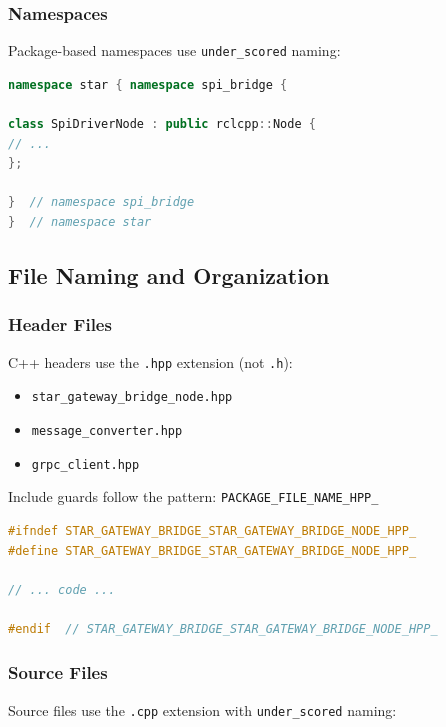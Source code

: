 \subsubsection{Namespaces}

Package-based namespaces use \texttt{under\_scored} naming:

\begin{lstlisting}[language=C++, caption={Namespace examples},
label={lst:namespace}]
namespace star { namespace spi_bridge {

class SpiDriverNode : public rclcpp::Node {
// ...
};

}  // namespace spi_bridge
}  // namespace star
\end{lstlisting}

\subsection{File Naming and Organization}

\subsubsection{Header Files}

C++ headers use the \texttt{.hpp} extension (not \texttt{.h}):

\begin{itemize}
\item \texttt{star\_gateway\_bridge\_node.hpp}
\item \texttt{message\_converter.hpp}
\item \texttt{grpc\_client.hpp}
\end{itemize}

Include guards follow the pattern: \texttt{PACKAGE\_FILE\_NAME\_HPP\_}

\begin{lstlisting}[language=C++, caption={Include guard example},
label={lst:include_guard}]
#ifndef STAR_GATEWAY_BRIDGE_STAR_GATEWAY_BRIDGE_NODE_HPP_
#define STAR_GATEWAY_BRIDGE_STAR_GATEWAY_BRIDGE_NODE_HPP_

// ... code ...

#endif  // STAR_GATEWAY_BRIDGE_STAR_GATEWAY_BRIDGE_NODE_HPP_
\end{lstlisting}

\subsubsection{Source Files}

Source files use the \texttt{.cpp} extension with \texttt{under\_scored} naming:

